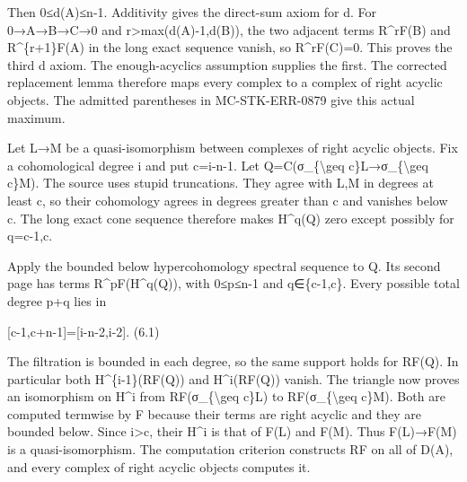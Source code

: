 Then 0≤d(A)\allowbreak{}≤n-1. Additivity gives the direct-sum axiom for d. For 0\allowbreak{}→A\allowbreak{}→B\allowbreak{}→C\allowbreak{}→0 and r>max(d(A)\allowbreak{}-1,\allowbreak{}d(B)\allowbreak{})\allowbreak{},\allowbreak{} the two adjacent terms R\textasciicircum{}rF(B)\allowbreak{} and R\textasciicircum{}\{r\allowbreak{}+1\}F(A)\allowbreak{} in the long exact sequence vanish,\allowbreak{} so R\textasciicircum{}rF(C)\allowbreak{}\allowbreak{}=0. This proves the third d axiom. The enough-acyclics assumption supplies the first. The corrected replacement lemma therefore maps every complex to a complex of right acyclic objects. The admitted parentheses in MC-STK-ERR-0879 give this actual maximum.

Let L\allowbreak{}→M be a quasi-isomorphism between complexes of right acyclic objects. Fix a cohomological degree i and put c\allowbreak{}=i-n-1. Let Q\allowbreak{}=C(σ\_\allowbreak{}\{\textbackslash{}geq c\}L\allowbreak{}→σ\_\allowbreak{}\{\textbackslash{}geq c\}M)\allowbreak{}. The source uses stupid truncations. They agree with L,\allowbreak{}M in degrees at least c,\allowbreak{} so their cohomology agrees in degrees greater than c and vanishes below c. The long exact cone sequence therefore makes H\textasciicircum{}q(Q)\allowbreak{} zero except possibly for q\allowbreak{}=c-1,\allowbreak{}c.

Apply the bounded below hypercohomology spectral sequence to Q. Its second page has terms R\textasciicircum{}pF(H\textasciicircum{}q(Q)\allowbreak{})\allowbreak{},\allowbreak{} with 0≤p≤n-1 and q\allowbreak{}∈\{c-1,\allowbreak{}c\}. Every possible total degree p\allowbreak{}+q lies in

[c-1,\allowbreak{}c\allowbreak{}+n-1]\allowbreak{}\allowbreak{}=[i-n-2,\allowbreak{}i-2]\allowbreak{}. (6.1)\allowbreak{}

The filtration is bounded in each degree,\allowbreak{} so the same support holds for RF(Q)\allowbreak{}. In particular both H\textasciicircum{}\{i-1\}(RF(Q)\allowbreak{})\allowbreak{} and H\textasciicircum{}i(RF(Q)\allowbreak{})\allowbreak{} vanish. The triangle now proves an isomorphism on H\^{}i from RF(σ\_\allowbreak{}\{\textbackslash{}geq c\}L)\allowbreak{} to RF(σ\_\allowbreak{}\{\textbackslash{}geq c\}M)\allowbreak{}. Both are computed termwise by F because their terms are right acyclic and they are bounded below. Since i>c,\allowbreak{} their H\^{}i is that of F(L)\allowbreak{} and F(M)\allowbreak{}. Thus F(L)\allowbreak{}\allowbreak{}→F(M)\allowbreak{} is a quasi-isomorphism. The computation criterion constructs RF on all of D(A)\allowbreak{},\allowbreak{} and every complex of right acyclic objects computes it.

